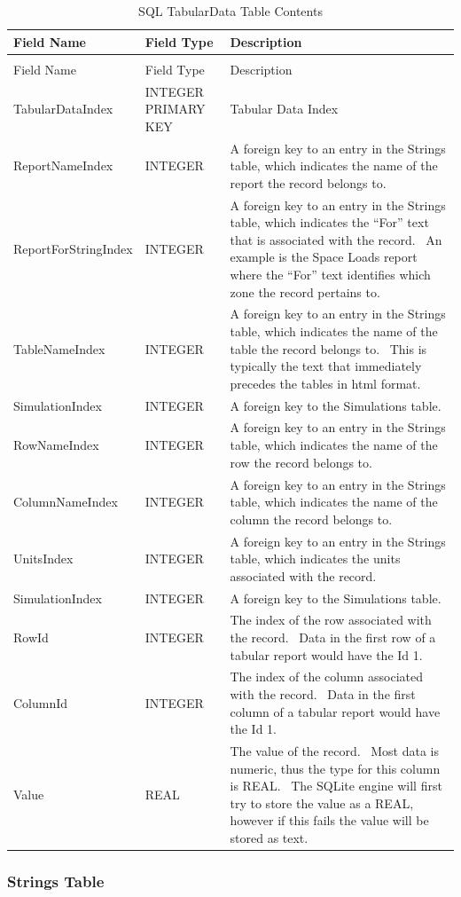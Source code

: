 \begin{longtable}[c]{>{\raggedright}p{1.5in}>{\raggedright}p{1.5in}>{\raggedright}p{3.0in}}
\caption{SQL TabularData Table Contents \label{table:table-38.-sql-tabulardata-table-contents}} \tabularnewline
\toprule
Field Name & Field Type & Description \tabularnewline
\midrule
\endfirsthead

\caption[]{SQL TabularData Table Contents} \tabularnewline
\toprule
Field Name & Field Type & Description \tabularnewline
\midrule
\endhead

TabularDataIndex & INTEGER PRIMARY KEY & Tabular Data Index \tabularnewline
ReportNameIndex & INTEGER & A foreign key to an entry in the Strings table, which indicates the name of the report the record belongs to. \tabularnewline
ReportFor\-String\-Index & INTEGER & A foreign key to an entry in the Strings table, which indicates the “For” text that is associated with the record.~ An example is the Space Loads report where the “For” text identifies which zone the record pertains to. \tabularnewline
TableNameIndex & INTEGER & A foreign key to an entry in the Strings table, which indicates the name of the table the record belongs to.~ This is typically the text that immediately precedes the tables in html format. \tabularnewline
Simulation\-Index & INTEGER & A foreign key to the Simulations table. \tabularnewline
RowNameIndex & INTEGER & A foreign key to an entry in the Strings table, which indicates the name of the row the record belongs to. \tabularnewline
ColumnName\-Index & INTEGER & A foreign key to an entry in the Strings table, which indicates the name of the column the record belongs to. \tabularnewline
UnitsIndex & INTEGER & A foreign key to an entry in the Strings table, which indicates the units associated with the record. \tabularnewline
Simulation\-Index & INTEGER & A foreign key to the Simulations table. \tabularnewline
RowId & INTEGER & The index of the row associated with the record.~ Data in the first row of a tabular report would have the Id 1. \tabularnewline
ColumnId & INTEGER & The index of the column associated with the record.~ Data in the first column of a tabular report would have the Id 1. \tabularnewline
Value & REAL & The value of the record.~ Most data is numeric, thus the type for this column is REAL.~ The SQLite engine will first try to store the value as a REAL, however if this fails the value will be stored as text. \tabularnewline
\bottomrule
\end{longtable}

\subsubsection{Strings Table}

